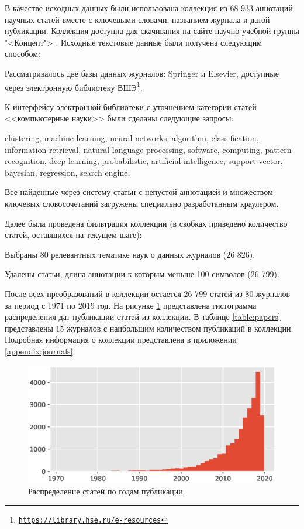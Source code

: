 \documentclass[12pt]{article}
\newenvironment{enumerate*}%
{\begin{enumerate}%
	\setlength{\itemsep}{0pt}%
	\setlength{\parskip}{0pt}}%
{\end{enumerate}}
\newcommand{\hrefl}[1] {\texttt{\href{#1}{#1}}}
\begin{document}
В качестве исходных данных были использована коллекция из 68 933 аннотаций научных статей вместе с ключевыми словами, названием журнала и датой публикации. Коллекция доступна для скачивания на сайте научно-учебной группы "<Концепт"> \cite{concept_datasets}.
Исходные текстовые данные были получена следующим способом:
\begin{enumerate*}
	\item Рассматривалось две базы данных журналов: Springer и Elsevier, доступные через электронную библиотеку ВШЭ\footnote{\hrefl{https://library.hse.ru/e-resources}}.
	\item К интерфейсу электронной библиотеки с уточнением категории статей <<компьютерные науки>> были сделаны следующие запросы:
	
	\textsf{clustering, machine learning, neural networks, algorithm, classification, information retrieval, natural language processing, software, computing, pattern recognition, deep learning, probabilistic, artificial intelligence, support vector, bayesian, regression, search engine}, 
	
	\item Все найденные через систему статьи с непустой аннотацией и множеством ключевых словосочетаний загружены специально разработанным краулером.
\end{enumerate*}
Далее была проведена фильтрация коллекции (в скобках приведено количество статей, оставшихся на текущем шаге):
\begin{enumerate*}
	\item Выбраны 80 релевантных тематике наук о данных журналов (26 826).
	\item Удалены статьи, длина аннотации к которым меньше 100 символов (26 799).
\end{enumerate*}
После всех преобразований в коллекции остается 26 799 статей из 80 журналов за период с 1971 по 2019 год. На рисунке \ref{fig:papersdatehist} представлена гистограмма распределения дат публикации статей из коллекции. В таблице \ref{table:papers} представлены 15 журналов с наибольшим количеством публикаций в коллекции. Подробная информация о коллекции представлена в приложении \ref{appendix:journals}. 

\begin{figure}
	\centering
	\includegraphics[width=0.5\linewidth]{images/papers_date_hist}
	\caption{Распределение статей по годам публикации.}
	\label{fig:papersdatehist}
\end{figure}
\end{document}

